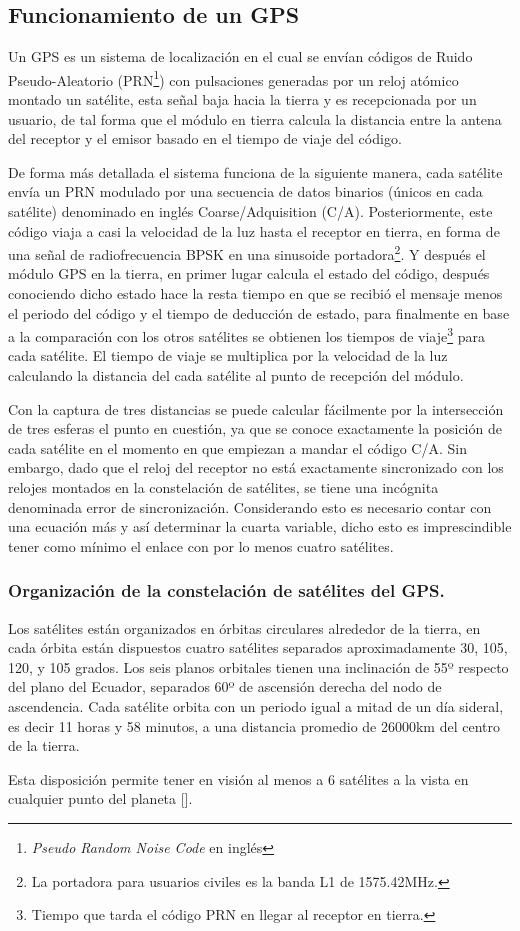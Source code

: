 \documentclass[10pt]{report}
\numberwithin{equation}{chapter}
\numberwithin{algorithm}{chapter}
\newcommand{\bcite}[1]{[\cite{#1}]}
\begin{document}
\subsection{Funcionamiento de un GPS}\label{gps_sec1}
Un GPS es un sistema de localización en el cual se envían códigos de Ruido Pseudo-Aleatorio (PRN\footnote{\emph{Pseudo Random Noise Code} en inglés}) con pulsaciones generadas por un reloj atómico montado un satélite, esta señal baja hacia la tierra y es recepcionada por un usuario, de tal forma que el módulo en tierra calcula la distancia entre la antena del receptor y el emisor basado en el tiempo de viaje del código. \par
De forma más detallada el sistema funciona de la siguiente manera, cada satélite envía un PRN modulado por una secuencia de datos binarios (únicos en cada satélite) denominado en inglés Coarse/Adquisition (C/A). Posteriormente, este código viaja a casi la velocidad de la luz hasta el receptor en tierra, en forma de una señal de radiofrecuencia BPSK en una sinusoide portadora\footnote{La portadora para usuarios civiles es la banda L1 de 1575.42MHz.}. Y después el módulo GPS en la tierra, en primer lugar calcula el estado del código, después conociendo dicho estado hace la resta tiempo en que se recibió el mensaje menos el periodo del código y el tiempo de deducción de estado, para finalmente en base a la comparación con los otros satélites se obtienen los tiempos de viaje\footnote{Tiempo que tarda el código PRN en llegar al receptor en tierra.} para cada satélite. El tiempo de viaje se multiplica por la velocidad de la luz calculando la distancia del cada satélite al punto de recepción del módulo.\par
Con la captura de tres distancias se puede calcular fácilmente por la intersección de tres esferas el punto en cuestión, ya que se conoce exactamente la posición de cada satélite en el momento en que empiezan a mandar el código C/A. Sin embargo, dado que el reloj del receptor no está exactamente sincronizado con los relojes montados en la constelación de satélites, se tiene una incógnita denominada error de sincronización. Considerando esto es necesario contar con una ecuación más y así determinar la cuarta variable, dicho esto es imprescindible tener como mínimo el enlace con por lo menos cuatro satélites. \par
\subsubsection{Organización de la constelación de satélites del GPS.}
Los satélites están organizados en órbitas circulares alrededor de la tierra, en cada órbita están dispuestos cuatro satélites separados aproximadamente 30, 105, 120, y 105 grados. Los seis planos orbitales tienen una inclinación de 55º respecto del plano del Ecuador, separados 60º de ascensión derecha del nodo de ascendencia. Cada satélite orbita con un periodo igual a mitad de un día sideral, es decir 11 horas y 58 minutos, a una distancia promedio de 26000km del centro de la tierra.\par
Esta disposición permite tener en visión al menos a 6 satélites a la vista en cualquier punto del planeta \bcite{Zogg2002}. 
\end{document}
